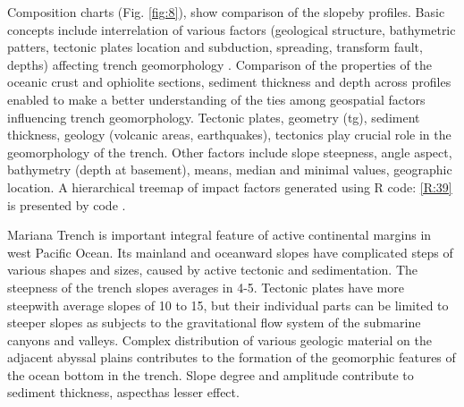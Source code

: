 \documentclass[11pt,a4paper]{report}
\begin{document}
{Composition charts (Fig. \ref{fig:8}), show comparison of the slope\degree\space by profiles. Basic concepts include interrelation of various factors (geological structure, bathymetric patters, tectonic plates location and subduction, spreading, transform fault, depths) affecting trench geomorphology \cite{Lemenkova202013}. Comparison of the properties of the oceanic crust and ophiolite sections, sediment thickness and depth across profiles enabled to make a better understanding of the ties among geospatial factors influencing trench geomorphology. Tectonic plates, geometry (tg\degree), sediment thickness, geology (volcanic areas, earthquakes), tectonics play crucial role in the geomorphology of the trench. Other factors include slope steepness\degree, angle aspect, bathymetry (depth at basement), means, median and minimal values, geographic location. A hierarchical treemap of impact factors generated using R code: \ref{R:39} is presented by code \cite{Lemenkova201871}. 

Mariana Trench is important integral feature of active continental margins in west Pacific Ocean. Its mainland and oceanward slopes have complicated steps of various shapes and sizes, caused by active tectonic and sedimentation. The steepness of the trench slopes averages in 4-5\degree. Tectonic plates have more steep\degree\space with average slopes of 10 to 15\degree, but their individual parts can be limited to steeper slopes as subjects to the gravitational flow system of the submarine canyons and valleys. Complex distribution of various geologic material on the adjacent abyssal plains contributes to the formation of the geomorphic features of the ocean bottom in the trench. Slope degree and amplitude contribute to sediment thickness, aspect\degree has lesser effect.
	
}
\end{document}
